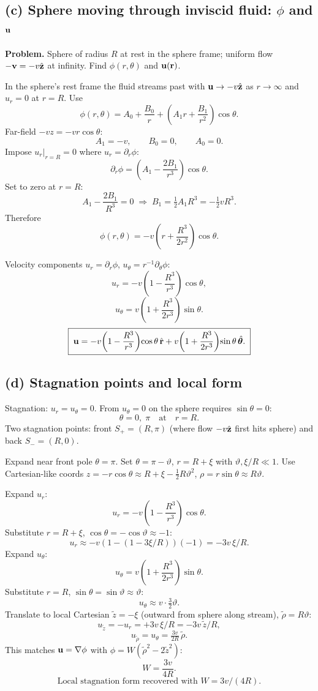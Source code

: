 \documentclass[11pt]{article}
\begin{document}
\subsection*{(c) Sphere moving through inviscid fluid: $\phi$ and $\vb u$}

\textbf{Problem.} Sphere of radius $R$ at rest in the sphere frame; uniform flow $-\vb v=-v\hat{\vb z}$ at infinity. Find $\phi(r,\theta)$ and $\vb u(\vb r)$.

In the sphere's rest frame the fluid streams past with $\vb u\to -v\hat{\vb z}$ as $r\to\infty$ and $u_r=0$ at $r=R$. Use
\[ \phi(r,\theta) = A_0 + \frac{B_0}{r} + \!\left(A_1 r + \frac{B_1}{r^2}\right)\!\cos\theta. \]
Far-field $-vz = -vr\cos\theta$:
\[ A_1 = -v,\qquad B_0 = 0,\qquad A_0 = 0. \]
Impose $u_r|_{r=R}=0$ where $u_r = \partial_r\phi$:
\[ \partial_r\phi = \!\left(A_1 - \frac{2B_1}{r^3}\right)\!\cos\theta. \]
Set to zero at $r=R$:
\[ A_1 - \frac{2B_1}{R^3} = 0 \;\Rightarrow\; B_1 = \tfrac{1}{2}A_1 R^3 = -\tfrac{1}{2}vR^3. \]
Therefore
\[ \boxed{\;\phi(r,\theta) = -v\!\left(r + \frac{R^3}{2r^2}\right)\!\cos\theta.\;} \]

Velocity components $u_r=\partial_r\phi$, $u_\theta = r^{-1}\partial_\theta\phi$:
\[ u_r = -v\!\left(1 - \frac{R^3}{r^3}\right)\!\cos\theta, \]
\[ u_\theta = v\!\left(1 + \frac{R^3}{2r^3}\right)\!\sin\theta. \]
\[ \boxed{\;\vb u = -v\!\left(1-\frac{R^3}{r^3}\right)\!\cos\theta\,\hat{\vb r} + v\!\left(1+\frac{R^3}{2r^3}\right)\!\sin\theta\,\hat{\bm\theta}.\;} \]

\subsection*{(d) Stagnation points and local form}

Stagnation: $u_r=u_\theta=0$. From $u_\theta=0$ on the sphere requires $\sin\theta=0$:
\[ \theta = 0,\;\pi \quad\text{at}\quad r=R. \]
Two stagnation points: front $S_+ = (R,\pi)$ (where flow $-v\hat{\vb z}$ first hits sphere) and back $S_- = (R,0)$.

Expand near front pole $\theta=\pi$. Set $\theta = \pi - \vartheta$, $r = R+\xi$ with $\vartheta,\xi/R \ll 1$. Use Cartesian-like coords $z = -r\cos\theta \approx R+\xi - \tfrac{1}{2}R\vartheta^2$, $\rho = r\sin\theta \approx R\vartheta$.

Expand $u_r$:
\[ u_r = -v\!\left(1-\frac{R^3}{r^3}\right)\!\cos\theta. \]
Substitute $r=R+\xi$, $\cos\theta = -\cos\vartheta\approx -1$:
\[ u_r \approx -v\!\left(1 - (1-3\xi/R)\right)(-1) = -3v\,\xi/R. \]
Expand $u_\theta$:
\[ u_\theta = v\!\left(1+\frac{R^3}{2r^3}\right)\!\sin\theta. \]
Substitute $r=R$, $\sin\theta = \sin\vartheta \approx \vartheta$:
\[ u_\theta \approx v\cdot\tfrac{3}{2}\vartheta. \]
Translate to local Cartesian $\tilde z = -\xi$ (outward from sphere along stream), $\tilde\rho = R\vartheta$:
\[ u_{\tilde z} = -u_r = +3v\,\xi/R = -3v\,\tilde z/R, \]
\[ u_{\tilde\rho} = u_\theta = \tfrac{3v}{2R}\,\tilde\rho. \]
This matches $\vb u = \nabla\phi$ with $\phi = W(\tilde\rho^2 - 2\tilde z^2)$:
\[ W = \frac{3v}{4R}. \]
\[ \boxed{\;\text{Local stagnation form recovered with }W = 3v/(4R).\;} \]
\end{document}

